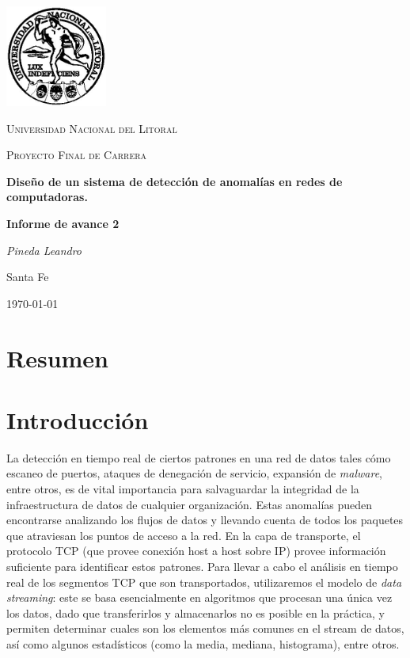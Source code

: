 \documentclass[a4paper,10pt, oneside]{article}
\begin{document}
	
\begin{titlepage}
	\centering
	\includegraphics[width=0.25\textwidth]{../../Universidad_del_Litoral}\par\vspace{1cm}
	{\scshape\LARGE Universidad Nacional del Litoral \par}
	\vspace{1cm}
	{\scshape\Large Proyecto Final de Carrera\par}
	\vspace{1.5cm}
	{\huge\bfseries Diseño de un sistema de detección de anomalías en redes de computadoras.\par}
	\vspace{4cm}
	{\huge\bfseries Informe de avance 2\par}
	\vfill
	
	{\Large \itshape Pineda Leandro\par}
	
	
	\large Santa Fe\par
	{\large \today\par}	
\end{titlepage}

\modulolinenumbers[5]
\linenumbers

\section*{Resumen}
\newpage

\section{Introducción}
La detección en tiempo real de ciertos patrones en una red de datos tales cómo escaneo de puertos, ataques de denegación de servicio, expansión de \textit{malware}, entre otros, es de vital importancia para salvaguardar la integridad de la infraestructura de datos de cualquier organización. Estas anomalías pueden encontrarse analizando los flujos de datos y llevando cuenta de todos los paquetes que atraviesan los puntos de acceso a la red. En la capa de transporte, el protocolo TCP (que provee conexión host a host sobre IP) provee información suficiente para identificar estos patrones. Para llevar a cabo el análisis en tiempo real de los segmentos TCP que son transportados, utilizaremos el modelo de \textit{data streaming}: este se basa esencialmente en algoritmos que procesan una única vez los datos, dado que transferirlos y almacenarlos no es posible en la práctica, y permiten determinar cuales son los elementos más comunes en el stream de datos, así como algunos estadísticos (como la media, mediana, histograma), entre otros.
\end{document}
